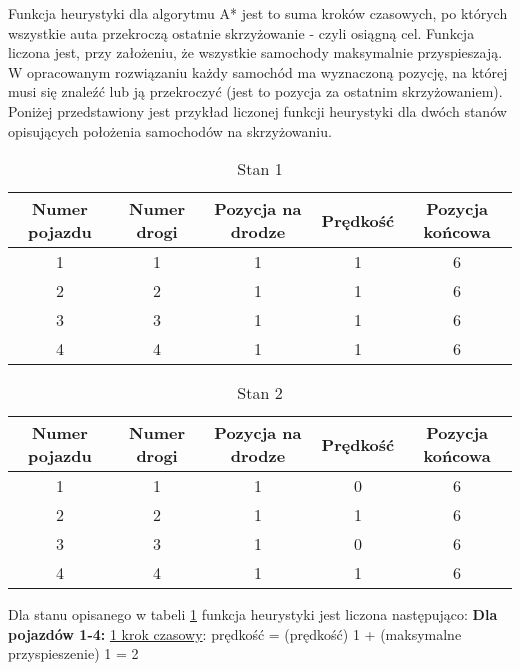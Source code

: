 Funkcja heurystyki dla algorytmu A* jest to suma kroków czasowych, po których wszystkie auta przekroczą ostatnie skrzyżowanie - czyli osiągną cel. Funkcja liczona jest, przy założeniu, że wszystkie samochody maksymalnie przyspieszają.
\newline
\indent
W opracowanym rozwiązaniu każdy samochód ma wyznaczoną pozycję, na której musi się znaleźć lub ją przekroczyć (jest to pozycja za ostatnim skrzyżowaniem). Poniżej przedstawiony jest przykład liczonej funkcji heurystyki dla dwóch stanów opisujących położenia samochodów na skrzyżowaniu.
\newpage
\begin{table}[t]
    \begin{tabular}{|c|c|c|c|c|}
      \hline 
      Numer pojazdu & Numer drogi & Pozycja na drodze & Prędkość & Pozycja końcowa\\
      \hline
      1 & 1 & 1 & 1 & 6 \\
      \hline
      2 & 2 & 1 & 1 & 6 \\
      \hline
      3 & 3 & 1 & 1 & 6 \\
      \hline
      4 & 4 & 1 & 1 & 6 \\
      \hline
    \end{tabular} 
    \caption{Stan 1}
    \label{FirstState}
\end{table}
\begin{table}[t]
    \begin{tabular}{|c|c|c|c|c|}
      \hline 
      Numer pojazdu & Numer drogi & Pozycja na drodze & Prędkość & Pozycja końcowa\\
      \hline
      1 & 1 & 1 & 0 & 6 \\
      \hline
      2 & 2 & 1 & 1 & 6 \\
      \hline
      3 & 3 & 1 & 0 & 6 \\
      \hline
      4 & 4 & 1 & 1 & 6 \\
      \hline
    \end{tabular} 
    \caption{Stan 2}
    \label{SecondState}
\end{table}
\newpage
Dla stanu opisanego w tabeli \ref{FirstState} funkcja heurystyki jest liczona następująco:
\newline
\newline
\textbf{Dla pojazdów 1-4:}
\newline
\newline
\underline{1 krok czasowy}:
\newline
\newline
prędkość = (prędkość) 1 + (maksymalne przyspieszenie) 1 = 2

